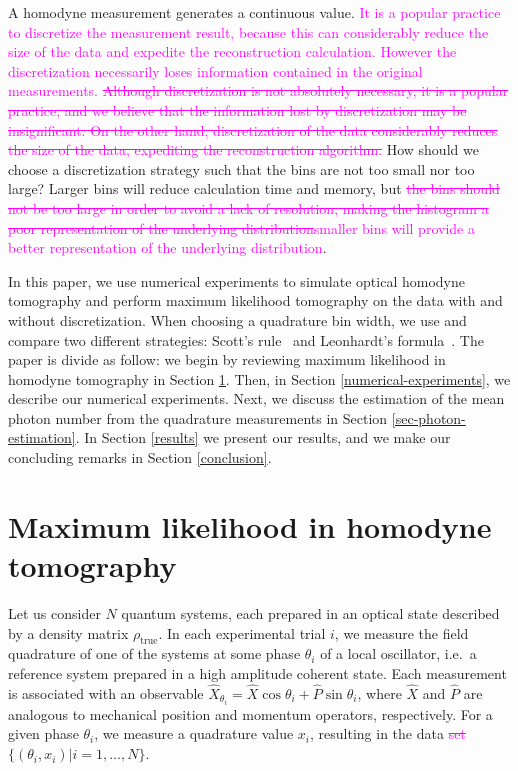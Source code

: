 \documentclass[
reprint,
superscriptaddress,
showpacs,
amsmath,
amssymb,
aps,
pra,
longbibliography
]{revtex4-1}
\providecommand{\aucmnt}[1]{#1}
\providecommand{\editcolor}[2]{\textcolor{#1}{#2}}
\providecommand{\aucmnt}[1]{}
\providecommand{\editcolor}[2]{#2}
\newcommand{\SG}[1]{\editcolor{magenta}{#1}}
\newcommand{\SGs}[1]{\aucmnt{\editcolor{magenta}{\sout{#1}}}}
\newcommand{\rhotrue}{\rho_{\text{true}}}
\begin{document}
A homodyne measurement generates a continuous value.  \SG{It is a
  popular practice to discretize the measurement result, because this
  can considerably reduce the size of the data and expedite the
  reconstruction calculation.  However the discretization necessarily
  loses information contained in the original measurements.}
\SGs{Although discretization is not absolutely necessary, it is a
  popular practice, and we believe that the information lost by
  discretization may be insignificant. On the other hand,
  discretization of the data considerably reduces the size of the
  data, expediting the reconstruction algorithm.} How should we choose
a discretization strategy such that the bins are not too small nor too
large? Larger bins will reduce calculation time and memory, but
\SGs{the bins should not be too large in order to avoid a lack of
  resolution, making the histogram a poor representation of the
  underlying distribution}\SG{smaller bins will provide a better
  representation of the underlying distribution}.
 
In this paper, we use numerical experiments to simulate optical
homodyne tomography and perform maximum likelihood tomography on the
data with and without discretization. When choosing a quadrature bin
width, we use and compare two different strategies: Scott's
rule~\cite{Scott2010} and Leonhardt's formula~\cite{Leonhardt1996}.
The paper is divide as follow: we begin by reviewing maximum
likelihood in homodyne tomography in Section \ref{MLE}. Then, in
Section \ref{numerical-experiments}, we describe our numerical
experiments. Next, we discuss the estimation of the mean photon number
from the quadrature measurements in Section
\ref{sec-photon-estimation}. In Section \ref{results} we present our
results, and we make our concluding remarks in Section
\ref{conclusion}.

\section{Maximum likelihood in homodyne tomography}
\label{MLE}
Let us consider $N$ quantum systems, each prepared in an optical state
described by a density matrix $\rhotrue$. In each experimental trial
$i$, we measure the field quadrature of one of the systems at some
phase $\theta_i$ of a local oscillator, i.e.\ a reference system
prepared in a high amplitude coherent state.  Each measurement is
associated with an observable
$\hat{X}_{\theta_i} = \hat{X} \cos \theta_i + \hat{P} \sin \theta_i$,
where $\hat{X}$ and $\hat{P}$ are analogous to mechanical position and
momentum operators, respectively. For a given phase $\theta_i$, we
measure a quadrature value $x_i$, resulting in the data\SGs{ set}
$\{(\theta_i, x_i)| i = 1, \ldots, N\}$.
\end{document}
